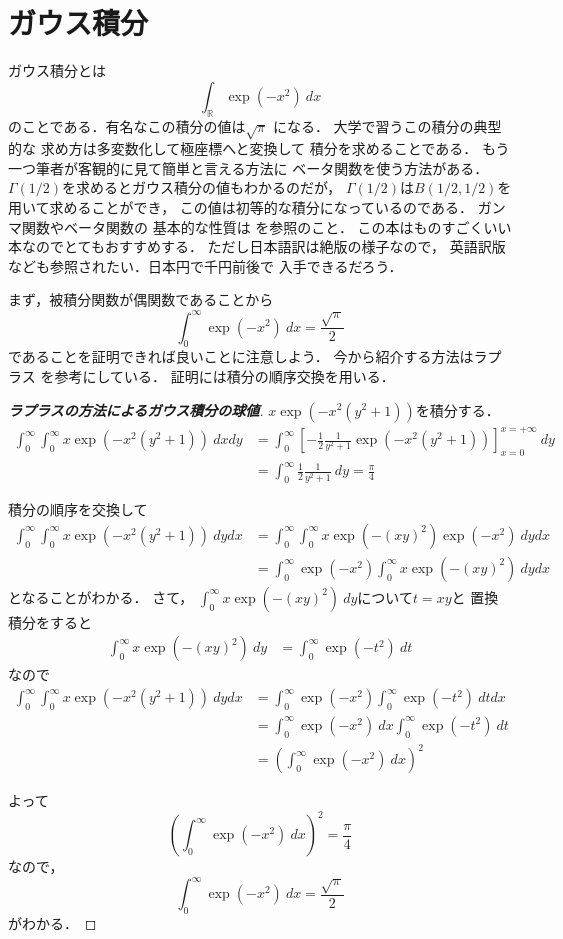 \documentclass[leqno, 12pt]{jsarticle}
\newcommand{\rr}{\mathbb{R}}
\begin{document}
\section{ガウス積分}
ガウス積分とは
\[
\int_{\rr}\exp(-x^2)\ dx
\]
のことである．有名なこの積分の値は$\sqrt{\pi}$
になる．
大学で習うこの積分の典型的な
求め方は多変数化して極座標へと変換して
積分を求めることである．
もう一つ筆者が客観的に見て簡単と言える方法に
ベータ関数を使う方法がある．
$\Gamma(1/2)$を求めるとガウス積分の値もわかるのだが，
$\Gamma(1/2)$は$B(1/2, 1/2)$を用いて求めることができ，
この値は初等的な積分になっているのである．
ガンマ関数やベータ関数の
基本的な性質は
\cite{4}を参照のこと．
この本はものすごくいい本なのでとてもおすすめする．
ただし日本語訳は絶版の様子なので，
英語訳版なども参照されたい．日本円で千円前後で
入手できるだろう．

まず，被積分関数が偶関数であることから
\[
\int_{0}^{\infty}\exp(-x^2)\  dx
=\frac{\sqrt{\pi}}{2}
\]
であることを証明できれば良いことに注意しよう．
今から紹介する方法はラプラス \cite{1}を参考にしている．
証明には積分の順序交換を用いる．
\begin{proof}[\textbf{ラプラスの方法によるガウス積分の球値}]
$x\exp(-x^2(y^2+1))$を積分する．
\begin{align*}
	\int_{0}^{\infty}\int_{0}^{\infty}x\exp(-x^2(y^2+1))\ dxdy
	&=
	\int_{0}^{\infty}
	\left[
	-\frac{1}{2}\frac{1}{y^2+1}\exp(-x^2(y^2+1))
	\right]_{x=0}^{x=+\infty}\ dy
	\\
	&=
	\int_{0}^{\infty}
	\frac{1}{2}\frac{1}{y^2+1}\ dy=\frac{\pi}{4}
\end{align*}

積分の順序を交換して
\begin{align*}
	\int_{0}^{\infty}\int_{0}^{\infty}x\exp(-x^2(y^2+1))\ dydx
	&=
	\int_{0}^{\infty}\int_{0}^{\infty}x\exp(-(xy)^2)\exp(-x^2)\ dydx
	\\
	&=
	\int_{0}^{\infty}\exp(-x^2)\int_{0}^{\infty}x\exp(-(xy)^2)\ dydx
\end{align*}
となることがわかる．
さて，
$\int_{0}^{\infty}x\exp(-(xy)^2)\ dy$について$t=xy$と
置換積分をすると
\begin{align*}
	\int_{0}^{\infty}x\exp(-(xy)^2)\ dy
	&=
	\int_{0}^{\infty}\exp(-t^2)\ dt
\end{align*}
なので
\begin{align*}
	\int_{0}^{\infty}\int_{0}^{\infty}x\exp(-x^2(y^2+1))\ dydx
	&=
	\int_{0}^{\infty}\exp(-x^2)\int_{0}^{\infty}\exp(-t^2)\ dtdx
	\\	
	&=
	\int_{0}^{\infty}\exp(-x^2)\ dx\int_{0}^{\infty}\exp(-t^2)\ dt
	\\
	&=
	\left(\int_{0}^{\infty}\exp(-x^2)\ dx\right)^2
\end{align*}

よって
\[
\left(\int_{0}^{\infty}\exp(-x^2)\ dx\right)^2=\frac{\pi}{4}
\]
なので，
\[
\int_{0}^{\infty}\exp(-x^2)\ dx=\frac{\sqrt{\pi}}{2}
\]
がわかる．
\end{proof}
\end{document}

